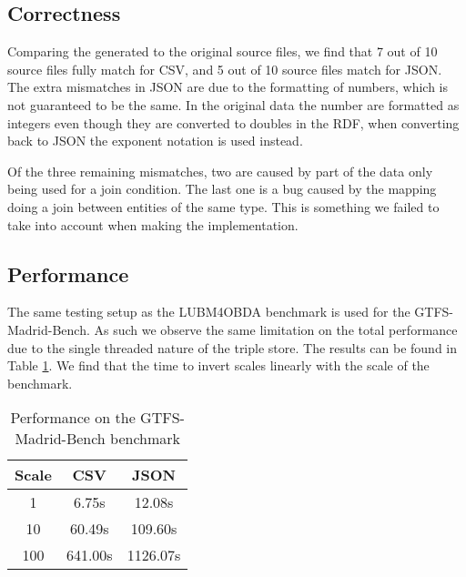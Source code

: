 \subsection{Correctness}
Comparing the generated to the original source files, we find that 7 out of 10 source files fully match for CSV, and 5 out of 10 source files match for JSON. The extra mismatches in JSON are due to the formatting of numbers, which is not guaranteed to be the same. In the original data the number are formatted as integers even though they are converted to doubles in the RDF, when converting back to JSON the exponent notation is used instead.

Of the three remaining mismatches, two are caused by part of the data only being used for a join condition. The last one is a bug caused by the mapping doing a join between entities of the same type. This is something we failed to take into account when making the implementation.

\subsection{Performance}
The same testing setup as the LUBM4OBDA benchmark is used for the GTFS-Madrid-Bench. As such we observe the same limitation on the total performance due to the single threaded nature of the triple store. The results can be found in Table \ref{table:gtfs-madrid-bench_performance}. We find that the time to invert scales linearly with the scale of the benchmark.

\begin{table}[h]
    \centering
    \begin{tabular}{|c|c|c|}
        \hline
        \textbf{Scale} & \textbf{CSV} & \textbf{JSON} \\
        \hline
        1              & 6.75s        & 12.08s        \\
        10             & 60.49s       & 109.60s       \\
        100            & 641.00s      & 1126.07s      \\
        \hline
    \end{tabular}
    \caption{\centering Performance on the GTFS-Madrid-Bench benchmark}
    \label{table:gtfs-madrid-bench_performance}
\end{table}
